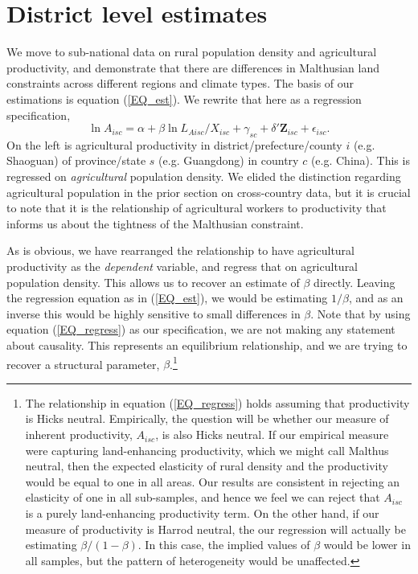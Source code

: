 \documentclass[11pt]{article}
\begin{document}
\section{District level estimates}
We move to sub-national data on rural population density and agricultural productivity, and demonstrate that there are differences in Malthusian land constraints across different regions and climate types. The basis of our estimations is equation (\ref{EQ_est}). We rewrite that here as a regression specification,
\begin{equation}
	\ln A_{isc} = \alpha + \beta \ln L_{Aisc}/X_{isc} + \gamma_{sc} + \delta' \mathbf{Z}_{isc} + \epsilon_{isc}. \label{EQ_regress}
\end{equation}
On the left is agricultural productivity in district/prefecture/county $i$ (e.g. Shaoguan) of province/state $s$ (e.g. Guangdong) in country $c$ (e.g. China). This is regressed on \textit{agricultural} population density. We elided the distinction regarding agricultural population in the prior section on cross-country data, but it is crucial to note that it is the relationship of agricultural workers to productivity that informs us about the tightness of the Malthusian constraint.

As is obvious, we have rearranged the relationship to have agricultural productivity as the \textit{dependent} variable, and regress that on agricultural population density. This allows us to recover an estimate of $\beta$ directly. Leaving the regression equation as in (\ref{EQ_est}), we would be estimating $1/\beta$, and as an inverse this would be highly sensitive to small differences in $\beta$. Note that by using equation (\ref{EQ_regress}) as our specification, we are not making any statement about causality. This represents an equilibrium relationship, and we are trying to recover a structural parameter, $\beta$.\footnote{The relationship in equation (\ref{EQ_regress}) holds assuming that productivity is Hicks neutral. Empirically, the question will be whether our measure of inherent productivity, $A_{isc}$, is also Hicks neutral. If our empirical measure were capturing land-enhancing productivity, which we might call Malthus neutral, then the expected elasticity of rural density and the productivity would be equal to one in all areas. Our results are consistent in rejecting an elasticity of one in all sub-samples, and hence we feel we can reject that $A_{isc}$ is a purely land-enhancing productivity term. On the other hand, if our measure of productivity is Harrod neutral, the our regression will actually be estimating $\beta/(1-\beta)$. In this case, the implied values of $\beta$ would be lower in all samples, but the pattern of heterogeneity would be unaffected.}
\end{document}
